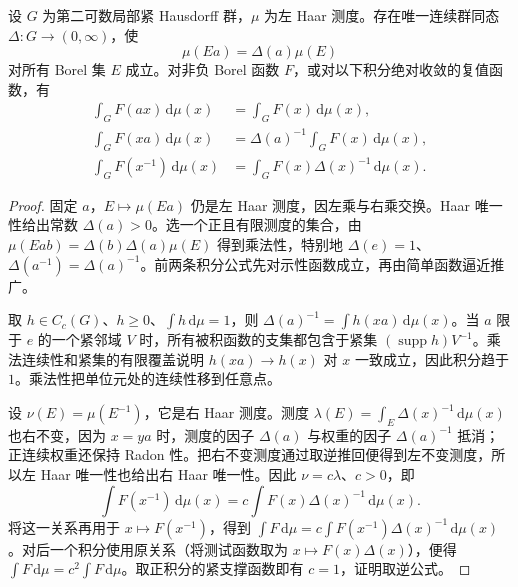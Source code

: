 \begin{proposition}[模函数与换元]
\label{b2:prop:I1-modular}
设 \(G\) 为第二可数局部紧 Hausdorff 群，\(\mu\) 为左 Haar 测度。存在唯一连续群同态 \(\Delta:G\to(0,\infty)\)，使
\begin{equation}
\label{b2:eq:I1-modular-convention}
 \mu(Ea)=\Delta(a)\mu(E)
\end{equation}
对所有 Borel 集 \(E\) 成立。对非负 Borel 函数 \(F\)，或对以下积分绝对收敛的复值函数，有
\begin{align}
 \int_G F(ax)\,\mathrm d\mu(x)&=\int_G F(x)\,\mathrm d\mu(x),\label{b2:eq:I1-left-change}\\
 \int_G F(xa)\,\mathrm d\mu(x)&=\Delta(a)^{-1}\int_G F(x)\,\mathrm d\mu(x),\label{b2:eq:I1-right-change}\\
 \int_G F(x^{-1})\,\mathrm d\mu(x)&=\int_G F(x)\Delta(x)^{-1}\,\mathrm d\mu(x).\label{b2:eq:I1-inverse-change}
\end{align}
\end{proposition}
\begin{proof}
固定 \(a\)，\(E\mapsto\mu(Ea)\) 仍是左 Haar 测度，因左乘与右乘交换。Haar 唯一性给出常数 \(\Delta(a)>0\)。选一个正且有限测度的集合，由 \(\mu(Eab)=\Delta(b)\Delta(a)\mu(E)\) 得到乘法性，特别地 \(\Delta(e)=1\)、\(\Delta(a^{-1})=\Delta(a)^{-1}\)。前两条积分公式先对示性函数成立，再由简单函数逼近推广。

取 \(h\in C_c(G)\)、\(h\ge0\)、\(\int h\,\mathrm d\mu=1\)，则 \(\Delta(a)^{-1}=\int h(xa)\,\mathrm d\mu(x)\)。当 \(a\) 限于 \(e\) 的一个紧邻域 \(V\) 时，所有被积函数的支集都包含于紧集 \((\operatorname{supp}h)V^{-1}\)。乘法连续性和紧集的有限覆盖说明 \(h(xa)\to h(x)\) 对 \(x\) 一致成立，因此积分趋于 \(1\)。乘法性把单位元处的连续性移到任意点。

设 \(\nu(E)=\mu(E^{-1})\)，它是右 Haar 测度。测度 \(\lambda(E)=\int_E\Delta(x)^{-1}\,\mathrm d\mu(x)\) 也右不变，因为 \(x=ya\) 时，测度的因子 \(\Delta(a)\) 与权重的因子 \(\Delta(a)^{-1}\) 抵消；正连续权重还保持 Radon 性。把右不变测度通过取逆推回便得到左不变测度，所以左 Haar 唯一性也给出右 Haar 唯一性。因此 \(\nu=c\lambda\)、\(c>0\)，即
\[
 \int F(x^{-1})\,\mathrm d\mu(x)
 =c\int F(x)\Delta(x)^{-1}\,\mathrm d\mu(x).
\]
将这一关系再用于 \(x\mapsto F(x^{-1})\)，得到 \(\int F\,\mathrm d\mu=c\int F(x^{-1})\Delta(x)^{-1}\,\mathrm d\mu(x)\)。对后一个积分使用原关系（将测试函数取为 \(x\mapsto F(x)\Delta(x)\)），便得 \(\int F\,\mathrm d\mu=c^2\int F\,\mathrm d\mu\)。取正积分的紧支撑函数即有 \(c=1\)，证明取逆公式。
\end{proof}

